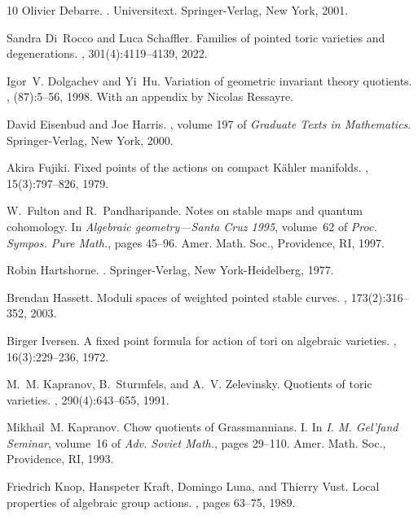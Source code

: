 \begin{thebibliography}{10}
Olivier Debarre.
.
\newblock Universitext. Springer-Verlag, New York, 2001.

Sandra Di~Rocco and Luca Schaffler.
\newblock Families of pointed toric varieties and degenerations.
, 301(4):4119--4139, 2022.

Igor~V. Dolgachev and Yi~Hu.
\newblock Variation of geometric invariant theory quotients.
, (87):5--56, 1998.
\newblock With an appendix by Nicolas Ressayre.

David Eisenbud and Joe Harris.
, volume 197 of {\em Graduate Texts in
  Mathematics}.
\newblock Springer-Verlag, New York, 2000.

Akira Fujiki.
\newblock Fixed points of the actions on compact {K}\"{a}hler manifolds.
, 15(3):797--826, 1979.

W.~Fulton and R.~Pandharipande.
\newblock Notes on stable maps and quantum cohomology.
\newblock In {\em Algebraic geometry---{S}anta {C}ruz 1995}, volume~62 of {\em
  Proc. Sympos. Pure Math.}, pages 45--96. Amer. Math. Soc., Providence, RI,
  1997.

Robin Hartshorne.
.
\newblock Springer-Verlag, New York-Heidelberg, 1977.

Brendan Hassett.
\newblock Moduli spaces of weighted pointed stable curves.
, 173(2):316--352, 2003.

Birger Iversen.
\newblock A fixed point formula for action of tori on algebraic varieties.
, 16(3):229--236, 1972.

M.~M. Kapranov, B.~Sturmfels, and A.~V. Zelevinsky.
\newblock Quotients of toric varieties.
, 290(4):643--655, 1991.

Mikhail~M. Kapranov.
\newblock Chow quotients of {G}rassmannians. {I}.
\newblock In {\em I. {M}. {G}el'fand {S}eminar}, volume~16 of {\em Adv. Soviet
  Math.}, pages 29--110. Amer. Math. Soc., Providence, RI, 1993.

Friedrich Knop, Hanspeter Kraft, Domingo Luna, and Thierry Vust.
\newblock Local properties of algebraic group actions.
, pages 63--75, 1989.


\end{thebibliography}
